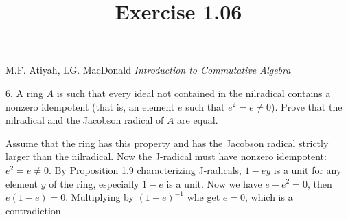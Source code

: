 \documentclass{article}
\title{Exercise 1.06}
\begin{document}
\maketitle

\begin{center}
M.F. Atiyah, I.G. MacDonald \emph{Introduction to Commutative Algebra}
\end{center}

\vspace*{10px} 

6. A ring $ A $ is such that every ideal not contained in the nilradical contains a nonzero idempotent (that is, an element $e$ such that $ e^2 = e \neq 0 $). Prove that the nilradical and the Jacobson radical of $A$ are equal.

\vspace*{10px} 

Assume that the ring has this property and has the Jacobson radical strictly larger than the nilradical. Now the J-radical must have nonzero idempotent: $ e^2 = e \neq 0 $. By Proposition 1.9 characterizing J-radicals, $ 1 - ey $ is a unit for any element $ y $ of the ring, especially $ 1 - e $ is a unit. Now we have $ e - e^2 = 0 $, then $ e(1-e) = 0 $. Multiplying by $ (1-e)^{-1} $ whe get $ e = 0 $, which is a contradiction.
\end{document}
